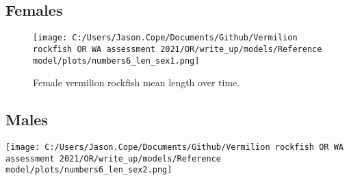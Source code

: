 \documentclass[11pt,
  english,
  a4paper,
]{article}
\begin{document}
\leavevmode\tagmcend\tagstructend


\hypertarget{females-1}{%
\subsection{Females}\label{females-1}}

\leavevmode\tagmcend\tagstructend


\begin{figure}
\centering
\texttt{[image: C:/Users/Jason.Cope/Documents/Github/Vermilion rockfish OR WA assessment 2021/OR/write\_up/models/Reference model/plots/numbers6\_len\_sex1.png]}
\caption{Female vermilion rockfish mean length over time.\label{fig:num_lts_females}}
\end{figure}

\tagmcend\tagstructend


\hypertarget{males-1}{%
\subsection{Males}\label{males-1}}

\leavevmode\tagmcend\tagstructend


\texttt{[image: C:/Users/Jason.Cope/Documents/Github/Vermilion rockfish OR WA assessment 2021/OR/write\_up/models/Reference model/plots/numbers6\_len\_sex2.png]} \clearpage

\tagmcend\tagstructend
\end{document}
